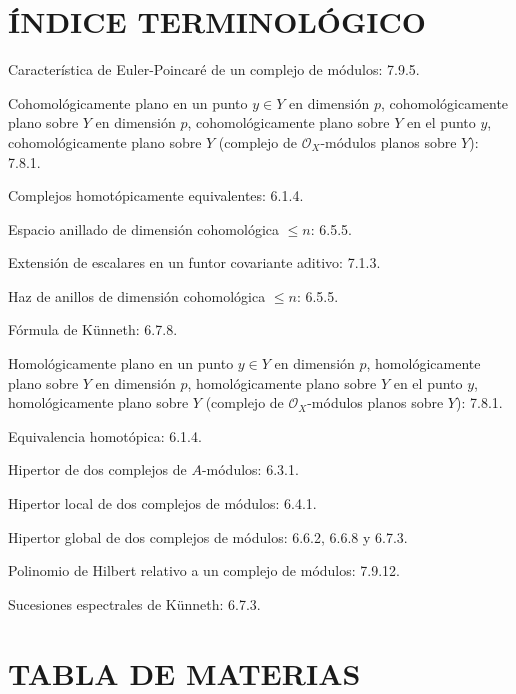 \documentclass[10pt,oneside]{book}
\newcommand{\oldpage}[2][]{\setcounter{footnote}{0}\marginpar{\scriptsize\textbf{#1}~|~#2}\ignorespaces}
\begin{document}
\clearpage
\oldpage[III]{214}
\section*{ÍNDICE TERMINOLÓGICO}

\begin{flushleft}
Característica de Euler-Poincaré de un complejo de módulos: 7.9.5.

\medskip
Cohomológicamente plano en un punto $y\in Y$ en dimensión $p$,
cohomológicamente plano sobre $Y$ en dimensión $p$, cohomológicamente plano
sobre $Y$ en el punto $y$, cohomológicamente plano sobre $Y$ (complejo de
$\mathscr O_X$-módulos planos sobre $Y$): 7.8.1.

\medskip
Complejos homotópicamente equivalentes: 6.1.4.

\medskip
Espacio anillado de dimensión cohomológica $\leq n$: 6.5.5.

\medskip
Extensión de escalares en un funtor covariante aditivo: 7.1.3.

\medskip
Haz de anillos de dimensión cohomológica $\leq n$: 6.5.5.

\medskip
Fórmula de Künneth: 6.7.8.

\medskip
Homológicamente plano en un punto $y\in Y$ en dimensión $p$,
homológicamente plano sobre $Y$ en dimensión $p$, homológicamente plano sobre
$Y$ en el punto $y$, homológicamente plano sobre $Y$ (complejo de
$\mathscr O_X$-módulos planos sobre $Y$): 7.8.1.

\medskip
Equivalencia homotópica: 6.1.4.

\medskip
Hipertor de dos complejos de $A$-módulos: 6.3.1.

\medskip
Hipertor local de dos complejos de módulos: 6.4.1.

\medskip
Hipertor global de dos complejos de módulos: 6.6.2, 6.6.8 y 6.7.3.

\medskip
Polinomio de Hilbert relativo a un complejo de módulos: 7.9.12.

\medskip
Sucesiones espectrales de Künneth: 6.7.3.
\end{flushleft}

\clearpage
\oldpage[III]{215}
\section*{TABLA DE MATERIAS}
\end{document}
